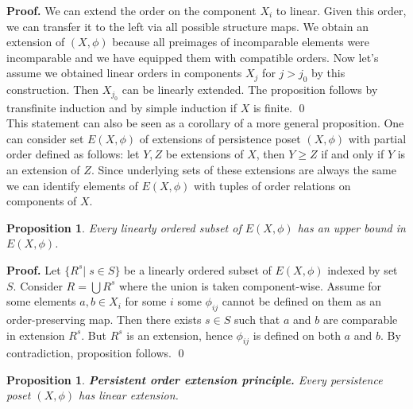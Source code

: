 \documentclass[a4paper, 12pt]{article}
\newcounter{stmcounter}[section]
\numberwithin{equation}{section}
\newtheorem{proposition}[stmcounter]{Proposition}
\theoremstyle{definition}
\theoremstyle{remark}
\newenvironment{pf}{\noindent\textbf{Proof.}}{\qed}
\renewcommand{\geq}{\geqslant}
\begin{document}
\begin{pf}
  We can extend the order on the component $X_i$ to linear. Given this order, we can transfer it to the left via all possible structure maps. We obtain an extension of $(X,\phi)$ because all preimages of incomparable elements were incomparable and we have equipped them with compatible orders. Now let's assume we obtained linear orders in components $X_j$ for $j > j_0$ by this construction. Then $X_{j_0}$ can be linearly extended. The proposition follows by transfinite induction and by simple induction if $X$ is finite.
\end{pf}\\

This statement can also be seen as a corollary of a more general proposition.
One can consider set $E(X,\phi)$ of extensions of persistence poset $(X,\phi)$ with partial order defined as follows: let $Y, Z$ be extensions of $X$, then $Y \geq Z$ if and only if $Y$ is an extension of $Z$. Since underlying sets of these extensions are always the same we can identify elements of $E(X,\phi)$ with tuples of order relations on components of $X$.

\begin{proposition}
  Every linearly ordered subset of $E(X,\phi)$ has an upper bound in $E(X,\phi)$.
\end{proposition}

\begin{pf}
  Let $\{R^s|\;s \in S\}$ be a linearly ordered subset of $E(X,\phi)$ indexed by set $S$. Consider $R = \bigcup R^s$ where the union is taken component-wise. Assume for some elements $a, b \in X_i$ for some $i$ some $\phi_{ij}$ cannot be defined on them as an order-preserving map. Then there exists $s \in S$ such that $a$ and $b$ are comparable in extension $R^s$. But $R^s$ is an extension, hence $\phi_{ij}$ is defined on both $a$ and $b$. By contradiction, proposition follows.
\end{pf}

\begin{proposition}
  \textbf{Persistent order extension principle.} Every persistence poset $(X,\phi)$ has linear extension.
\end{proposition}
\end{document}
